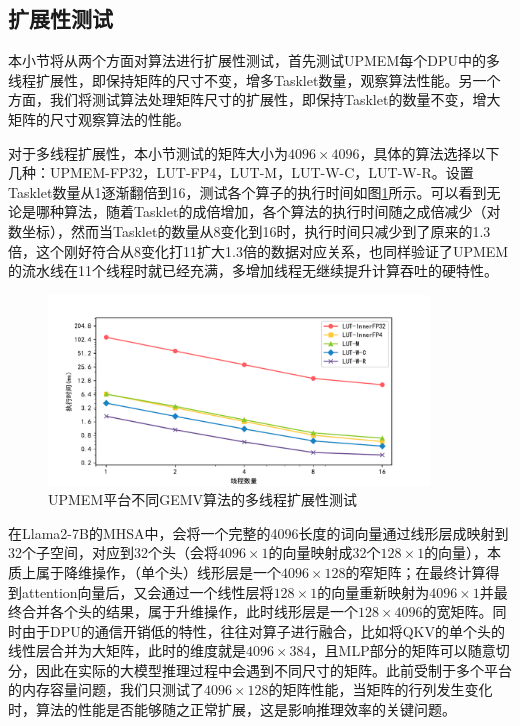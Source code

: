 \subsection{扩展性测试}
本小节将从两个方面对算法进行扩展性测试，首先测试UPMEM每个DPU中的多线程扩展性，即保持矩阵的尺寸不变，增多Tasklet数量，观察算法性能。另一个方面，我们将测试算法处理矩阵尺寸的扩展性，即保持Tasklet的数量不变，增大矩阵的尺寸观察算法的性能。

对于多线程扩展性，本小节测试的矩阵大小为$4096\times 4096$，具体的算法选择以下几种：UPMEM-FP32，LUT-FP4，LUT-M，LUT-W-C，LUT-W-R。设置Tasklet数量从1逐渐翻倍到16，测试各个算子的执行时间如图\ref{EXP3-1}所示。可以看到无论是哪种算法，随着Tasklet的成倍增加，各个算法的执行时间随之成倍减少（对数坐标），然而当Tasklet的数量从8变化到16时，执行时间只减少到了原来的1.3倍，这个刚好符合从8变化打11扩大1.3倍的数据对应关系，也同样验证了UPMEM的流水线在11个线程时就已经充满，多增加线程无继续提升计算吞吐的硬特性。

\begin{figure}[htbp]
    \centering
    \includegraphics[width=0.9\textwidth]{figures/Exp3-1.pdf}
    \caption{UPMEM平台不同GEMV算法的多线程扩展性测试}
	\label{EXP3-1} %
\end{figure}

在Llama2-7B的MHSA中，会将一个完整的4096长度的词向量通过线形层成映射到32个子空间，对应到32个头（会将$4096\times 1$的向量映射成32个$128\times 1$的向量），本质上属于降维操作，（单个头）线形层是一个$4096\times 128$的窄矩阵；在最终计算得到attention向量后，又会通过一个线性层将$128\times 1$的向量重新映射为$4096\times 1$并最终合并各个头的结果，属于升维操作，此时线形层是一个$128\times 4096$的宽矩阵。同时由于DPU的通信开销低的特性，往往对算子进行融合，比如将QKV的单个头的线性层合并为大矩阵，此时的维度就是$4096\times 384$，且MLP部分的矩阵可以随意切分，因此在实际的大模型推理过程中会遇到不同尺寸的矩阵。此前受制于多个平台的内存容量问题，我们只测试了$4096\times 128$的矩阵性能，当矩阵的行列发生变化时，算法的性能是否能够随之正常扩展，这是影响推理效率的关键问题。

